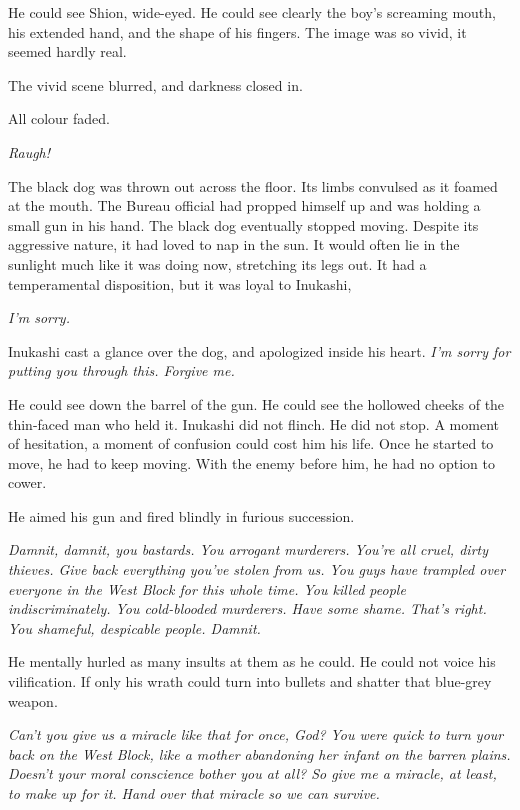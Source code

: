 He could see Shion, wide-eyed. He could see clearly the boy's screaming
mouth, his extended hand, and the shape of his fingers. The image was so
vivid, it seemed hardly real.

The vivid scene blurred, and darkness closed in.

All colour faded.

\mybreak

\emph{Raugh!}

The black dog was thrown out across the floor. Its limbs convulsed as it
foamed at the mouth. The Bureau official had propped himself up and was
holding a small gun in his hand. The black dog eventually stopped
moving. Despite its aggressive nature, it had loved to nap in the sun.
It would often lie in the sunlight much like it was doing now,
stretching its legs out. It had a temperamental disposition, but it was
loyal to Inukashi,

\emph{I'm sorry.}

Inukashi cast a glance over the dog, and apologized inside his heart.
\emph{I'm sorry for putting you through this. Forgive me.}

He could see down the barrel of the gun. He could see the hollowed
cheeks of the thin-faced man who held it. Inukashi did not flinch. He
did not stop. A moment of hesitation, a moment of confusion could cost
him his life. Once he started to move, he had to keep moving. With the
enemy before him, he had no option to cower.

He aimed his gun and fired blindly in furious succession.

\emph{Damnit, damnit, you bastards. You arrogant murderers. You're all cruel,
	dirty thieves. Give back everything you've stolen from us. You guys have
	trampled over everyone in the West Block for this whole time. You killed
	people indiscriminately. You cold-blooded murderers. Have some shame.
	That's right. You shameful, despicable people. Damnit.}

He mentally hurled as many insults at them as he could. He could not
voice his vilification. If only his wrath could turn into bullets and
shatter that blue-grey weapon.

\emph{Can't you give us a miracle like that for once, God? You were quick to
	turn your back on the West Block, like a mother abandoning her infant on
	the barren plains. Doesn't your moral conscience bother you at all? So
	give me a miracle, at least, to make up for it. Hand over that miracle
	so we can survive.}

